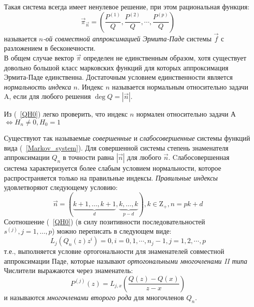 Такая система всегда имеет ненулевое решение, при
этом рациональная функция:\\
\begin{equation}
\label{HermitePade} \overrightarrow{\pi}_{\overrightarrow{n}}=
\left( \frac {P^{(1)}} {Q}, \frac {P^{(2)}} {Q}, \cdots, \frac
{P^{(p)}} {Q} \right)
\end{equation}
называется \textit{$n$-ой совместной аппроксимацией Эрмита-Паде}
системы $\overrightarrow{f}$ с разложением в бесконечности. \\ В
общем случае вектор $\overrightarrow{\pi}$ определен не
единственным образом, хотя существует довольно большой класс
марковских функций для которых аппроксимация Эрмита-Паде
единственна. Достаточным условием единственности является \textit{
нормальность индекса} $n$. Индекс $n$ называется нормальным
относительно задачи A, если для любого решения $\deg Q=|\overrightarrow{n}|$. \\
\begin{coly} Из (~\ref{QH0}) легко проверить, что индекс $n$
нормален относительно задачи А $\Leftrightarrow H_n \not= 0, H_0
= 1$ \end{coly}
Существуют так называемые \textit{совершенные} и \textit{слабосовершенные} системы функций вида (~\ref{Markov_system}).
Для совершенной системы степень знаменателя аппроксимации $Q_n$ в
точности равна $|\overrightarrow{n}|$ для любого
$\overrightarrow{n}$. Cлабосовершенная система характеризуется
более слабым условием нормальности, которое распространяется
только на правильные индексы. \textit{Правильные индексы}
удовлетворяют следующему условию:
$$
\overrightarrow{n}=(\underbrace{k+1,\ldots,k+1}_{d},\underbrace{k,\ldots,k}_{p-d}),
k\in{\mbox{Z}}_{+},n=pk+d
$$
Соотношение (~\ref{QH0}) (в силу позитивности последовательностей
${s^{(j)}}, j=1,\ldots,p$) можно переписать в следующем виде:
\begin{equation}
\label{QOrthogonality} L_j(Q_n(z)z^i) = 0, i =0,1,\cdots, n_j-1,
j=1,2,\cdots,p
\end{equation}
т.е., выполняется условие ортогональности для знаменателей
совместной аппроксимации Паде, которые называют \textit{ортогональными
многочленами II типа} \\ Числители выражаются через
знаменатель:
$$
P^{(j)}(z)=L_{j,x} \left( \displaystyle \frac {Q(z)-Q(x)}{z-x}
\right)
$$
и называются \textit{многочленами второго рода} для многочленов $Q_n$. \\
